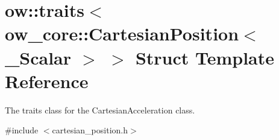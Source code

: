 \hypertarget{structow_1_1traits_3_01ow__core_1_1CartesianPosition_3_01__Scalar_01_4_01_4}{}\section{ow\+:\+:traits$<$ ow\+\_\+core\+:\+:Cartesian\+Position$<$ \+\_\+\+Scalar $>$ $>$ Struct Template Reference}
\label{structow_1_1traits_3_01ow__core_1_1CartesianPosition_3_01__Scalar_01_4_01_4}


The traits class for the Cartesian\+Acceleration class.  




{\ttfamily \#include $<$cartesian\+\_\+position.\+h$>$}

